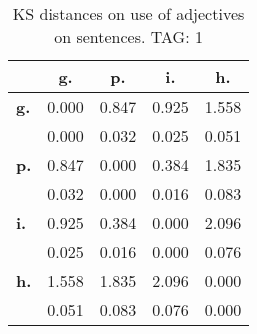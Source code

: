 \begin{table}[h!]
\begin{center}
\begin{tabular}{| l || c | c | c | c |}\hline
 & {\bf g.} & {\bf p.} & {\bf i.} & {\bf h.} \\\hline\hline
{\bf g.} & 0.000 & 0.847 & 0.925 & 1.558 \\
{\bf } & 0.000 & 0.032 & 0.025 & 0.051 \\\hline
{\bf p.} & 0.847 & 0.000 & 0.384 & 1.835 \\
{\bf } & 0.032 & 0.000 & 0.016 & 0.083 \\\hline
{\bf i.} & 0.925 & 0.384 & 0.000 & 2.096 \\
{\bf } & 0.025 & 0.016 & 0.000 & 0.076 \\\hline
{\bf h.} & 1.558 & 1.835 & 2.096 & 0.000 \\
{\bf } & 0.051 & 0.083 & 0.076 & 0.000 \\\hline
\end{tabular}
\caption{KS distances on use of adjectives on sentences. TAG: 1}
\end{center}
\end{table}